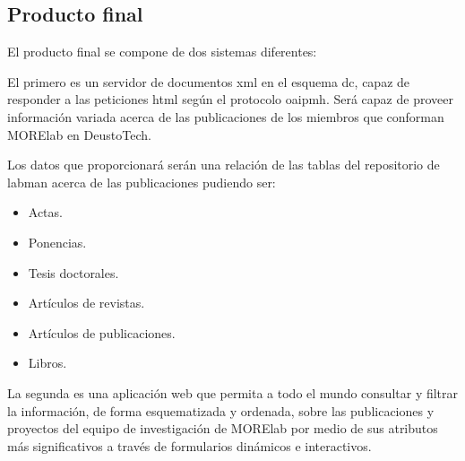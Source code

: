 \subsection{Producto final}

El producto final se compone de dos sistemas diferentes:

El primero es un servidor de documentos \acrfull{xml}\cite{XML} en el esquema \acrshort{dc}, capaz de responder a las peticiones \acrshort{html} según el protocolo \acrshort{oaipmh}. Será capaz de proveer información variada acerca de las publicaciones de los miembros que conforman MORElab en DeustoTech.

Los datos que proporcionará serán una relación de las tablas del repositorio de \acrshort{labman} acerca de las publicaciones pudiendo ser:

\begin{itemize}
	\item Actas.
	\item Ponencias.
	\item Tesis doctorales.
	\item Artículos de revistas.
	\item Artículos de publicaciones.
	\item Libros.

\end{itemize}

La segunda es una aplicación web que permita a todo el mundo consultar y filtrar la información, de forma esquematizada y ordenada, sobre las publicaciones y proyectos del equipo de investigación de MORElab por medio de sus atributos más significativos a través de formularios dinámicos e interactivos.